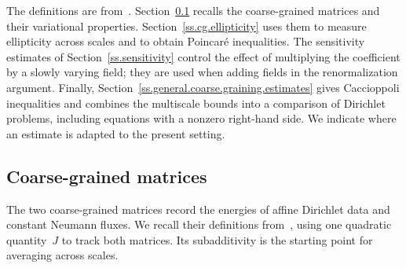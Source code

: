 \documentclass[11pt]{amsart}
\begin{document}
\smallskip

The definitions are from~\citet{AK.HC}. Section~\ref{ss.cg.mats} recalls the coarse-grained matrices and their variational properties. Section~\ref{ss.cg.ellipticity} uses them to measure ellipticity across scales and to obtain Poincar\'e inequalities. The sensitivity estimates of Section~\ref{ss.sensitivity} control the effect of multiplying the coefficient by a slowly varying field; they are used when adding fields in the renormalization argument. Finally, Section~\ref{ss.general.coarse.graining.estimates} gives Caccioppoli inequalities and combines the multiscale bounds into a comparison of Dirichlet problems, including equations with a nonzero right-hand side. We indicate where an estimate is adapted to the present setting.

\begingroup\runinsubsubsections

\subsection{Coarse-grained matrices}
\label{ss.cg.mats}

The two coarse-grained matrices record the energies of affine Dirichlet data and constant Neumann fluxes. We recall their definitions from~\citet{AK.HC}, using one quadratic quantity~$J$ to track both matrices. Its subadditivity is the starting point for averaging across scales.

\smallskip
\end{document}
